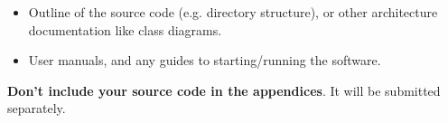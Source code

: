 \documentclass{l4proj}
\begin{document}
\begin{appendices}
\begin{itemize}
\item Outline of the source code (e.g. directory structure), or other architecture documentation like class diagrams.

\item User manuals, and any guides to starting/running the software.

\end{itemize}

\textbf{Don't include your source code in the appendices}. It will be
submitted separately.

\end{appendices}






\end{document}
